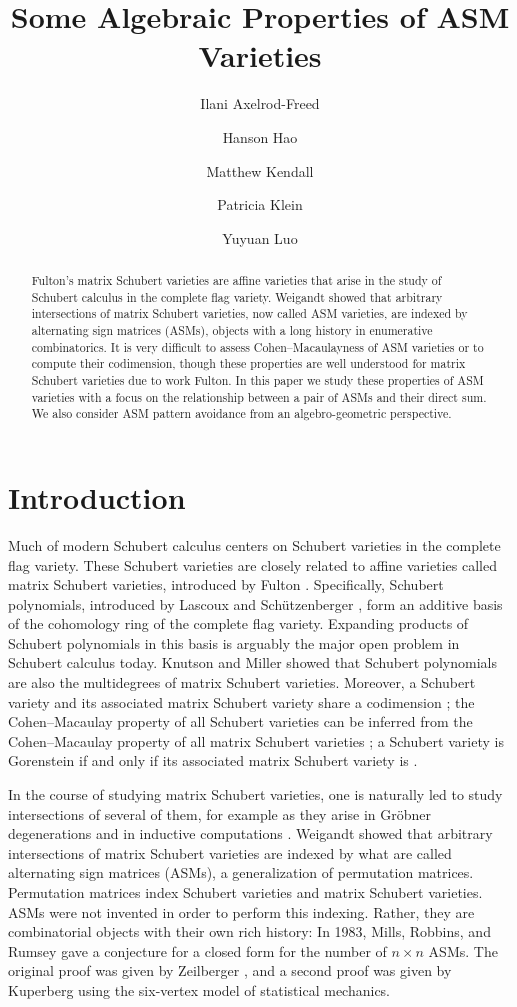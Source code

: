 \documentclass[12 pt]{amsart}
\title{Some Algebraic Properties of ASM Varieties}
\author[Axelrod-Freed]{Ilani Axelrod-Freed}
\author[Hao]{Hanson Hao}
\author[Kendall]{Matthew Kendall}
\author[Klein]{Patricia Klein}
\author[Luo]{Yuyuan Luo}
\theoremstyle{plain}
\theoremstyle{definition}
\theoremstyle{remark}
\begin{document}
\begin{abstract}
    Fulton's matrix Schubert varieties are affine varieties that arise in the study of Schubert calculus in the complete flag variety.  Weigandt showed that arbitrary intersections of matrix Schubert varieties, now called ASM varieties, are indexed by alternating sign matrices (ASMs), objects with a long history in enumerative combinatorics. It is very difficult to assess Cohen--Macaulayness of ASM varieties or to compute their codimension, though these properties are well understood for matrix Schubert varieties due to work Fulton.  In this paper we study these properties of ASM varieties with a focus on the relationship between a pair of ASMs and their direct sum.  We also consider ASM pattern avoidance from an algebro-geometric perspective.
\end{abstract}

\maketitle

\tableofcontents

\section{Introduction}
Much of modern Schubert calculus centers on Schubert varieties in the complete flag variety.  These Schubert varieties are closely related to affine varieties called matrix Schubert varieties, introduced by Fulton \cite{Ful92}.  Specifically, Schubert polynomials, introduced by Lascoux and Sch{\"u}tzenberger \cite{LS82}, form an additive basis of the cohomology ring of the complete flag variety.  Expanding products of Schubert polynomials in this basis is arguably the major open problem in Schubert calculus today.  Knutson and Miller \cite{KM05} showed that Schubert polynomials are also the multidegrees  of matrix Schubert varieties.  Moreover, a Schubert variety and its associated matrix Schubert variety share a codimension \cite{Ful92}; the Cohen--Macaulay property of all Schubert varieties can be inferred from the Cohen--Macaulay property of all matrix Schubert varieties \cite{Ful92, KM05}; a Schubert variety is Gorenstein if and only if its associated matrix Schubert variety is \cite{WY06}.

In the course of studying matrix Schubert varieties, one is naturally led to study intersections of several of them, for example as they arise in Gr\"obner degenerations and in inductive computations \cite{KW21}.  Weigandt \cite{Wei17} showed that arbitrary intersections of matrix Schubert varieties are indexed by what are called alternating sign matrices (ASMs), a generalization of permutation matrices.  Permutation matrices index Schubert varieties and matrix Schubert varieties.  ASMs were not invented in order to perform this indexing.  Rather, they are combinatorial objects with their own rich history:  In 1983, Mills, Robbins, and Rumsey \cite{MRR83} gave a conjecture for a closed form for the number of $n \times n$ ASMs.
The original proof was given by Zeilberger \cite{Zei96}, and a second proof was given by
Kuperberg \cite{Kup96} using the six-vertex model of statistical mechanics.
\end{document}
